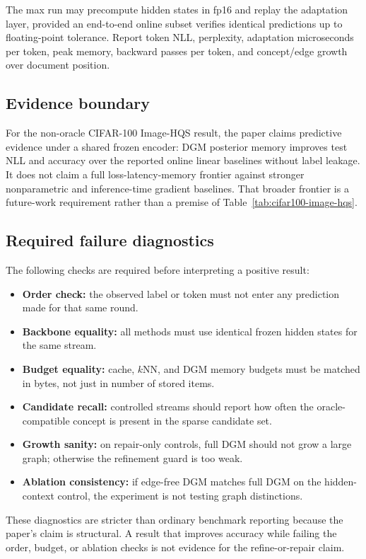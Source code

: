 The max run may precompute hidden states in fp16 and replay the adaptation
layer, provided an end-to-end online subset verifies identical predictions up to
floating-point tolerance. Report token NLL, perplexity, adaptation microseconds
per token, peak memory, backward passes per token, and concept/edge growth over
document position.

\subsection{Evidence boundary}

For the non-oracle CIFAR-100 Image-HQS result, the paper claims predictive
evidence under a shared frozen encoder: DGM posterior memory improves test NLL
and accuracy over the reported online linear baselines without label leakage.
It does not claim a full loss-latency-memory frontier against stronger
nonparametric and inference-time gradient baselines. That broader frontier is a
future-work requirement rather than a premise of
Table~\ref{tab:cifar100-image-hqs}.

\subsection{Required failure diagnostics}

The following checks are required before interpreting a positive result:
\begin{itemize}
    \item \textbf{Order check:} the observed label or token must not enter any
    prediction made for that same round.
    \item \textbf{Backbone equality:} all methods must use identical frozen
    hidden states for the same stream.
    \item \textbf{Budget equality:} cache, $k$NN, and DGM memory budgets must be
    matched in bytes, not just in number of stored items.
    \item \textbf{Candidate recall:} controlled streams should report how often
    the oracle-compatible concept is present in the sparse candidate set.
    \item \textbf{Growth sanity:} on repair-only controls, full DGM should not
    grow a large graph; otherwise the refinement guard is too weak.
    \item \textbf{Ablation consistency:} if edge-free DGM matches full DGM on the
    hidden-context control, the experiment is not testing graph distinctions.
\end{itemize}

These diagnostics are stricter than ordinary benchmark reporting because the
paper's claim is structural. A result that improves accuracy while failing the
order, budget, or ablation checks is not evidence for the refine-or-repair
claim.
